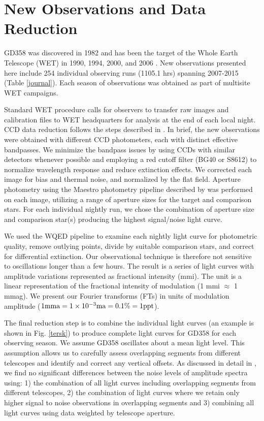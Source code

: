 \documentclass[12pt,preprint]{aastex}
\begin{document}
\section {New Observations and Data Reduction}\label{data}

GD358 was discovered in 1982 \citep{Winget82} and has been the target of the Whole 
Earth Telescope (WET) in 1990, 1994, 2000, and 2006 \citep{Provencal09, Kepler03,Winget94}. 
New observations presented here include 254 individual observing runs (1105.1 hrs) spanning 
2007-2015 (Table \ref{journal}). Each season of observations was obtained as part of 
multisite WET campaigns. 

Standard WET procedure calls for observers to transfer raw images and 
calibration files to WET headquarters for analysis at the end of each local night. CCD 
data reduction follows the steps described in \citet{Provencal12}. In brief, the new observations 
were obtained with different CCD photometers, each with distinct effective bandpasses. 
We minimize the bandpass issues by using CCDs with similar detectors whenever possible and 
employing a red cutoff filter (BG40 or S8612) to normalize wavelength response and 
reduce extinction effects. We corrected each image for bias and thermal noise, and 
normalized by the flat field. Aperture photometry using the Maestro photometry pipeline 
described by \citet{Dalessio10} was performed on each image, utilizing a range of 
aperture sizes for the target and comparison stars. For each individual nightly run, we 
chose the combination of aperture size and comparison star(s) producing the highest 
signal/noise light curve. 

We used the WQED pipeline \citep{wqed} to examine each nightly light curve for photometric 
quality, remove outlying points, divide by suitable comparison stars, and correct for 
differential extinction. Our observational technique is therefore not sensitive to 
oscillations longer than a few hours. The result is a series of light curves 
with amplitude variations represented as fractional intensity (mmi). The unit is a linear 
representation of the fractional intensity of modulation (1 mmi $\approx$ 1 mmag). We present
our Fourier transforms (FTs) in units of modulation amplitude 
($1 {\rm mma}=1 \times 10^{-3} {\rm ma} = 0.1 \% = 1 {\rm ppt}$).

The final reduction step is to combine the individual light curves (an example is shown in Fig. \ref{tersk}) to produce 
complete light curves for GD358 for each observing season. We assume GD358 oscillates about 
a mean light level. This assumption allows us to carefully assess overlapping segments from 
different telescopes and identify and correct any vertical offsets. As discussed in detail 
in \citet{Provencal09}, we find no significant differences between the noise levels of 
amplitude spectra using: 1) the combination of all light curves including overlapping 
segments from different telescopes, 2) the combination of light curves where we retain 
only higher signal to noise observations in overlapping segments and 3) combining all light 
curves using data weighted by telescope aperture.
\end{document}
